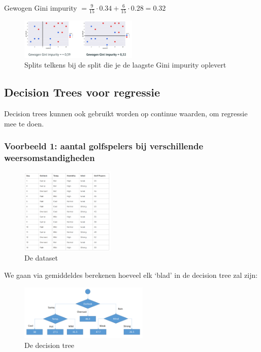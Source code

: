 \documentclass{article}
\begin{document}
Gewogen Gini impurity $= \frac{9}{15} \cdot 0.34 + \frac{6}{15}\cdot 0.28 = 0.32$

\begin{figure}[H]
    \centering
    \includegraphics[width=0.5\textwidth]{gini-impurity-3.png}
    \caption{Splits telkens bij de split die je de laagste Gini impurity oplevert}
\end{figure}

\subsection{Decision Trees voor regressie}

Decision trees kunnen ook gebruikt worden op continue waarden, om regressie mee te doen.

\subsubsection{Voorbeeld 1: aantal golfspelers bij verschillende weersomstandigheden}

\begin{figure}[H]
    \centering
    \includegraphics[width=0.4\textwidth]{decision-trees-regressie.png}
    \caption{De dataset}
\end{figure}

We gaan via gemiddeldes berekenen hoeveel elk `blad' in de decision tree zal zijn:

\begin{figure}[H]
    \centering
    \includegraphics[width=0.55\textwidth]{decision-trees-regressie2.png}
    \caption{De decision tree}
\end{figure}
\end{document}
